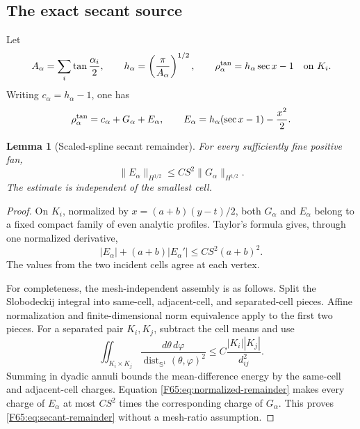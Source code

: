 \documentclass[11pt]{amsart}
\numberwithin{equation}{section}
\newtheorem{lemma}[theorem]{Lemma}
\theoremstyle{definition}
\theoremstyle{remark}
\newcommand{\Sone}{\mathbb S^1}
\begin{document}
\subsection{The exact secant source}

Let
\begin{equation}\label{F65:eq:secant}
 A_\alpha=\sum_i\tan\frac{\alpha_i}{2},
 \qquad h_\alpha=\left(\frac\pi{A_\alpha}\right)^{1/2},
 \qquad
 \rho_\alpha^{\rm tan}=h_\alpha\sec x-1
 \quad\hbox{on }K_i.
\end{equation}
Writing $c_\alpha=h_\alpha-1$, one has
\begin{equation}\label{F65:eq:secant-split}
 \rho_\alpha^{\rm tan}=c_\alpha+G_\alpha+E_\alpha,
 \qquad
 E_\alpha=h_\alpha(\sec x-1)-\frac{x^2}{2}.
\end{equation}

\begin{lemma}[Scaled-spline secant remainder]\label{F65:lem:secant-remainder}
For every sufficiently fine positive fan,
\begin{equation}\label{F65:eq:secant-remainder}
 \|E_\alpha\|_{H^{1/2}}
 \le CS^2\|G_\alpha\|_{H^{1/2}}.
\end{equation}
The estimate is independent of the smallest cell.
\end{lemma}

\begin{proof}
On $K_i$, normalized by $x=(a+b)(y-t)/2$, both $G_\alpha$ and
$E_\alpha$ belong to a fixed compact family of even analytic profiles.
Taylor's formula gives, through one normalized derivative,
\begin{equation}\label{F65:eq:normalized-remainder}
 |E_\alpha|+(a+b)|E_\alpha'|
 \le CS^2(a+b)^2.
\end{equation}
The values from the two incident cells agree at each vertex.

For completeness, the mesh-independent assembly is as follows.  Split the
Slobodeckij integral into same-cell, adjacent-cell, and separated-cell
pieces.  Affine normalization and finite-dimensional norm equivalence apply
to the first two pieces.  For a separated pair $K_i,K_j$, subtract the cell
means and use
\begin{equation}
 \iint_{K_i\times K_j}\frac{d\theta\,d\varphi}
 {\operatorname {dist}_{\Sone}(\theta,\varphi)^2}
 \le C\frac{|K_i||K_j|}{d_{ij}^2}.
\end{equation}
Summing in dyadic annuli bounds the mean-difference energy by the same-cell
and adjacent-cell charges.  Equation \eqref{F65:eq:normalized-remainder} makes
every charge of $E_\alpha$ at most $CS^2$ times the corresponding charge of
$G_\alpha$.  This proves \eqref{F65:eq:secant-remainder} without a mesh-ratio
assumption.
\end{proof}
\end{document}
